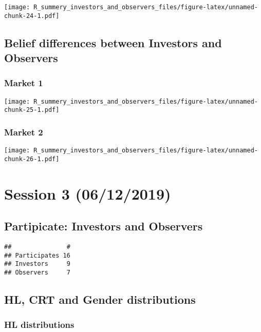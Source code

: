 \documentclass[]{article}
\begin{document}
\texttt{[image: R\_summery\_investors\_and\_observers\_files/figure-latex/unnamed-chunk-24-1.pdf]}

\hypertarget{belief-differences-between-investors-and-observers-1}{%
\subsection{Belief differences between Investors and
Observers}\label{belief-differences-between-investors-and-observers-1}}

\hypertarget{market-1-1}{%
\subsubsection{Market 1}\label{market-1-1}}

\texttt{[image: R\_summery\_investors\_and\_observers\_files/figure-latex/unnamed-chunk-25-1.pdf]}

\hypertarget{market-2-1}{%
\subsubsection{Market 2}\label{market-2-1}}

\texttt{[image: R\_summery\_investors\_and\_observers\_files/figure-latex/unnamed-chunk-26-1.pdf]}

\hypertarget{session-3-06122019}{%
\section{Session 3 (06/12/2019)}\label{session-3-06122019}}

\hypertarget{partipicate-investors-and-observers-2}{%
\subsection{Partipicate: Investors and
Observers}\label{partipicate-investors-and-observers-2}}

\begin{verbatim}
##               #
## Participates 16
## Investors     9
## Observers     7
\end{verbatim}

\hypertarget{hl-crt-and-gender-distributions-2}{%
\subsection{HL, CRT and Gender
distributions}\label{hl-crt-and-gender-distributions-2}}

\hypertarget{hl-distributions-2}{%
\subsubsection{HL distributions}\label{hl-distributions-2}}
\end{document}
